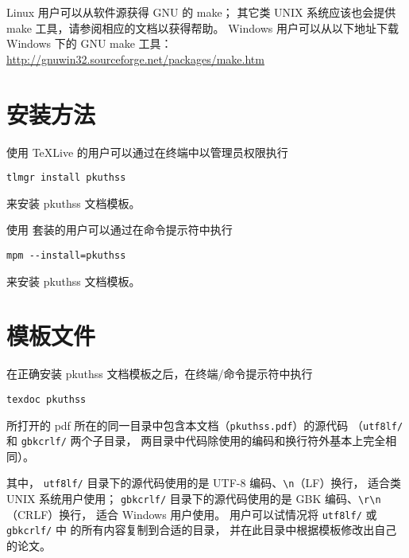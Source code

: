	Linux 用户可以从软件源获得 GNU 的 make；
	其它类 UNIX 系统应该也会提供 make 工具，请参阅相应的文档以获得帮助。%
	Windows 用户可以从以下地址下载 Windows 下的 GNU make 工具：\\
	\hspace*{\parindent}%
	\url{http://gnuwin32.sourceforge.net/packages/make.htm}

	\section{安装方法}\label{sec:inst}

	使用 \TeX{}Live 的用户可以通过在终端中以管理员权限执行
\begin{Verbatim}[frame = single]
tlmgr install pkuthss
\end{Verbatim}
	来安装 pkuthss 文档模板。

	使用 \CTeX{} 套装的用户可以通过在命令提示符中执行
\begin{Verbatim}[frame = single]
mpm --install=pkuthss
\end{Verbatim}
	来安装 pkuthss 文档模板。

	\section{模板文件}\label{sec:doc-dir}

	在正确安装 pkuthss 文档模板之后，在终端/命令提示符中执行
\begin{Verbatim}[frame = single]
texdoc pkuthss
\end{Verbatim}
	所打开的 pdf 所在的同一目录中包含本文档（\verb|pkuthss.pdf|）的源代码%
	（\verb|utf8lf/| 和 \verb|gbkcrlf/| 两个子目录，
	两目录中代码除使用的编码和换行符外基本上完全相同）。

	其中，%
	\verb|utf8lf/| 目录下的源代码使用的是 UTF-8 编码、\verb|\n|（LF）换行，
	适合类 UNIX 系统用户使用；%
	\verb|gbkcrlf/| 目录下的源代码使用的是 GBK 编码、\verb|\r\n|（CRLF）换行，
	适合 Windows 用户使用。%
	用户可以试情况将 \verb|utf8lf/| 或 \verb|gbkcrlf/| 中
	的所有内容复制到合适的目录，
	并在此目录中根据模板修改出自己的论文。

